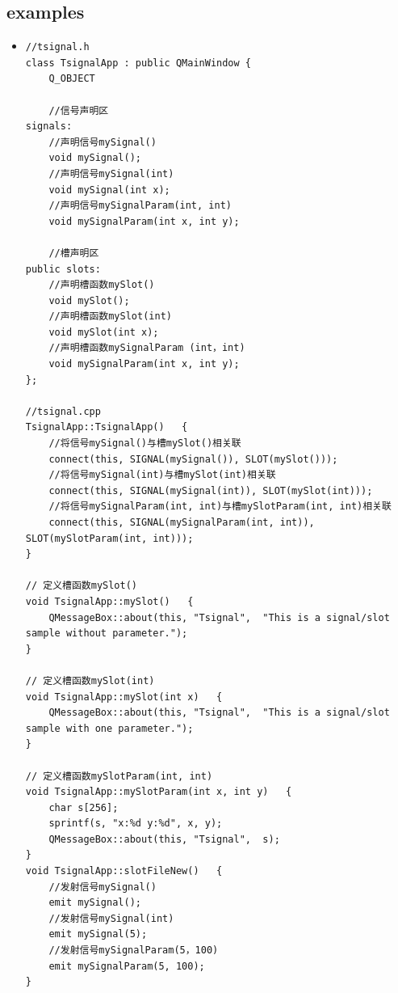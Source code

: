 \documentclass[9pt,b5paper]{article}
\begin{document}
\subsection{examples}
\label{sec-1-6}
\begin{itemize}
\item \lstset{language=java,label= ,caption= ,numbers=none}
\begin{lstlisting}
//tsignal.h  
class TsignalApp : public QMainWindow {  
    Q_OBJECT  

    //信号声明区  
signals:  
    //声明信号mySignal()  
    void mySignal();  
    //声明信号mySignal(int)  
    void mySignal(int x);  
    //声明信号mySignalParam(int, int)  
    void mySignalParam(int x, int y);  
 
    //槽声明区  
public slots:  
    //声明槽函数mySlot()  
    void mySlot();  
    //声明槽函数mySlot(int)  
    void mySlot(int x);  
    //声明槽函数mySignalParam (int，int)  
    void mySignalParam(int x, int y);  
};
 
//tsignal.cpp  
TsignalApp::TsignalApp()   {  
    //将信号mySignal()与槽mySlot()相关联  
    connect(this, SIGNAL(mySignal()), SLOT(mySlot()));  
    //将信号mySignal(int)与槽mySlot(int)相关联  
    connect(this, SIGNAL(mySignal(int)), SLOT(mySlot(int)));  
    //将信号mySignalParam(int, int)与槽mySlotParam(int, int)相关联  
    connect(this, SIGNAL(mySignalParam(int, int)), SLOT(mySlotParam(int, int)));  
}  
 
// 定义槽函数mySlot()  
void TsignalApp::mySlot()   {  
    QMessageBox::about(this, "Tsignal",  "This is a signal/slot sample without parameter.");  
}  
 
// 定义槽函数mySlot(int)  
void TsignalApp::mySlot(int x)   {  
    QMessageBox::about(this, "Tsignal",  "This is a signal/slot sample with one parameter.");  
}  
 
// 定义槽函数mySlotParam(int, int)  
void TsignalApp::mySlotParam(int x, int y)   {  
    char s[256];  
    sprintf(s, "x:%d y:%d", x, y);  
    QMessageBox::about(this, "Tsignal",  s);  
}  
void TsignalApp::slotFileNew()   {  
    //发射信号mySignal()  
    emit mySignal();  
    //发射信号mySignal(int)  
    emit mySignal(5);  
    //发射信号mySignalParam(5，100)  
    emit mySignalParam(5, 100);  
}
\end{lstlisting}
\end{itemize}
\end{document}
